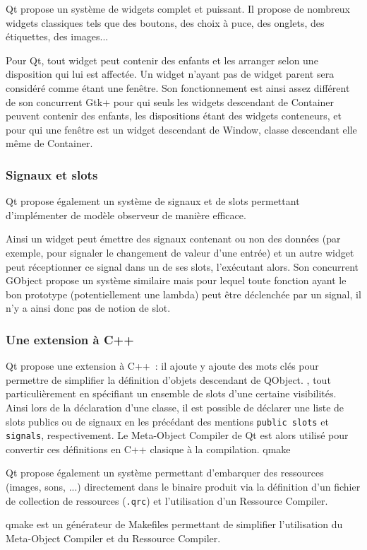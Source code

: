 Qt propose un système de widgets complet et puissant. Il propose de nombreux widgets classiques tels que des boutons, des choix à puce, des onglets, des étiquettes, des images...

Pour Qt, tout widget peut contenir des enfants et les arranger selon une disposition qui lui est affectée. Un widget n'ayant pas de widget parent sera considéré comme étant une fenêtre.
Son fonctionnement est ainsi assez différent de son concurrent Gtk+ pour qui seuls les widgets descendant de Container peuvent contenir des enfants, les dispositions étant des widgets conteneurs, et pour qui une fenêtre est un widget descendant de Window, classe descendant elle même de Container.

\subsubsection{Signaux et slots}

Qt propose également un système de signaux et de slots permettant d'implémenter de modèle observeur de manière efficace.

Ainsi un widget peut émettre des signaux contenant ou non des données (par exemple, pour signaler le changement de valeur d'une entrée) et un autre widget peut réceptionner ce signal dans un de ses slots, l'exécutant alors.
Son concurrent GObject propose un système similaire mais pour lequel toute fonction ayant le bon prototype (potentiellement une lambda) peut être déclenchée par un signal, il n'y a ainsi donc pas de notion de slot.

\subsubsection{Une extension à C++}

Qt propose une extension à C++~: il ajoute y ajoute des mots clés pour permettre de simplifier la définition d'objets descendant de QObject.
, tout particulièrement en spécifiant un ensemble de slots d'une certaine visibilités.
Ainsi lors de la déclaration d'une classe, il est possible de déclarer une liste de slots publics ou de signaux en les précédant des mentions \verb|public slots| et \verb|signals|, respectivement.
Le Meta-Object Compiler de Qt est alors utilisé pour convertir ces définitions en C++ clasique à la compilation.
qmake

Qt propose également un système permettant d'embarquer des ressources (images, sons, ...) directement dans le binaire produit via la définition d'un fichier de collection de ressources (\verb|.qrc|) et l'utilisation d'un Ressource Compiler.

qmake est un générateur de Makefiles permettant de simplifier l'utilisation du Meta-Object Compiler et du Ressource Compiler.

